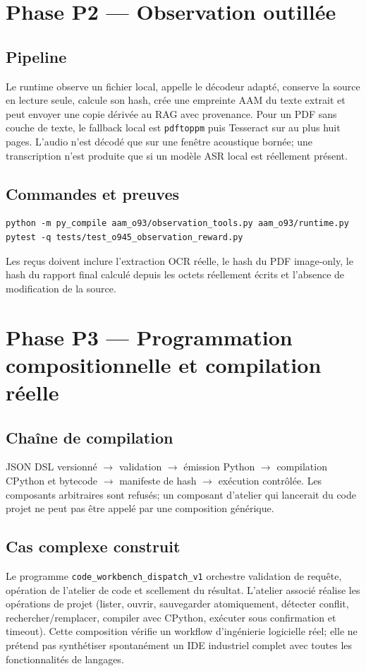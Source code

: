 \documentclass[11pt,a4paper]{article}
\begin{document}
\section{Phase P2 — Observation outillée}
\subsection{Pipeline}
Le runtime observe un fichier local, appelle le décodeur adapté, conserve la source en lecture seule, calcule son hash, crée une empreinte AAM du texte extrait et peut envoyer une copie dérivée au RAG avec provenance. Pour un PDF sans couche de texte, le fallback local est \texttt{pdftoppm} puis Tesseract sur au plus huit pages. L'audio n'est décodé que sur une fenêtre acoustique bornée; une transcription n'est produite que si un modèle ASR local est réellement présent.
\subsection{Commandes et preuves}
\begin{verbatim}
python -m py_compile aam_o93/observation_tools.py aam_o93/runtime.py
pytest -q tests/test_o945_observation_reward.py
\end{verbatim}
Les reçus doivent inclure l'extraction OCR réelle, le hash du PDF image-only, le hash du rapport final calculé depuis les octets réellement écrits et l'absence de modification de la source.

\section{Phase P3 — Programmation compositionnelle et compilation réelle}
\subsection{Chaîne de compilation}
JSON DSL versionné \(\to\) validation \(\to\) émission Python \(\to\) compilation CPython et bytecode \(\to\) manifeste de hash \(\to\) exécution contrôlée. Les composants arbitraires sont refusés; un composant d'atelier qui lancerait du code projet ne peut pas être appelé par une composition générique.
\subsection{Cas complexe construit}
Le programme \texttt{code\_workbench\_dispatch\_v1} orchestre validation de requête, opération de l'atelier de code et scellement du résultat. L'atelier associé réalise les opérations de projet (lister, ouvrir, sauvegarder atomiquement, détecter conflit, rechercher/remplacer, compiler avec CPython, exécuter sous confirmation et timeout). Cette composition vérifie un workflow d'ingénierie logicielle réel; elle ne prétend pas synthétiser spontanément un IDE industriel complet avec toutes les fonctionnalités de langages.
\end{document}

